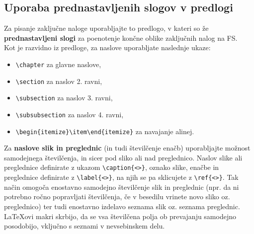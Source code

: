 \subsection{Uporaba prednastavljenih slogov v predlogi}\label{sec:prednastavitve}
Za pisanje zaključne naloge uporabljajte to predlogo, v kateri so že \textbf{prednastavljeni slogi} za poenotenje končne oblike zaključnih nalog na FS.\\

Kot je razvidno iz predloge, za naslove uporabljate naslednje ukaze:
\begin{itemize}
\item \verb|\chapter| za glavne naslove,
\item \verb|\section| za naslov 2. ravni,
\item \verb|\subsection| za naslov 3. ravni,
\item \verb|\subsubsection| za naslov 4. ravni,
\item \verb|\begin{itemize}\item\end{itemize}| za navajanje alinej.
\end{itemize}

Za \textbf{naslove slik in preglednic} (in tudi številčenje enačb) uporabljajte možnost samodejnega številčenja, in sicer pod sliko ali nad preglednico. Naslov slike ali preglednice definirate z ukazom \verb|\caption{<>}|, oznako slike, enačbe in preglednice definirate z \verb|\label{<>}|, na njih se pa sklicujete z \verb|\ref{<>}|. Tak način omogoča enostavno samodejno številčenje slik in preglednic (npr. da ni potrebno ročno popravljati številčenja, če v besedilu vrinete novo sliko oz. preglednico) ter tudi enostavno izdelavo seznama slik oz. seznama preglednic. \LaTeX ovi makri skrbijo, da se vsa številčena polja ob prevajanju samodejno posodobijo, vključno s seznami v nevsebinskem delu.\\

